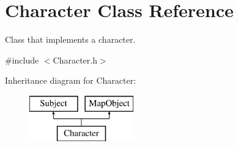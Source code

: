 \hypertarget{class_character}{}\section{Character Class Reference}
\label{class_character}


Class that implements a character.  




{\ttfamily \#include $<$Character.\+h$>$}

Inheritance diagram for Character\+:\begin{figure}[H]
\begin{center}
\leavevmode
\includegraphics[height=2.000000cm]{class_character}
\end{center}
\end{figure}
